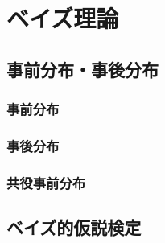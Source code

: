 \chapter{ベイズ理論}
\label{chap:stat-bayes}

\begin{chaptergoal}
\end{chaptergoal}

\section{事前分布・事後分布}
\label{sec:stat-prior-posterior}



\subsection{事前分布}

\subsection{事後分布}

\subsection{共役事前分布}

\section{ベイズ的仮説検定}
\label{sec:stat-bayes-testing}

